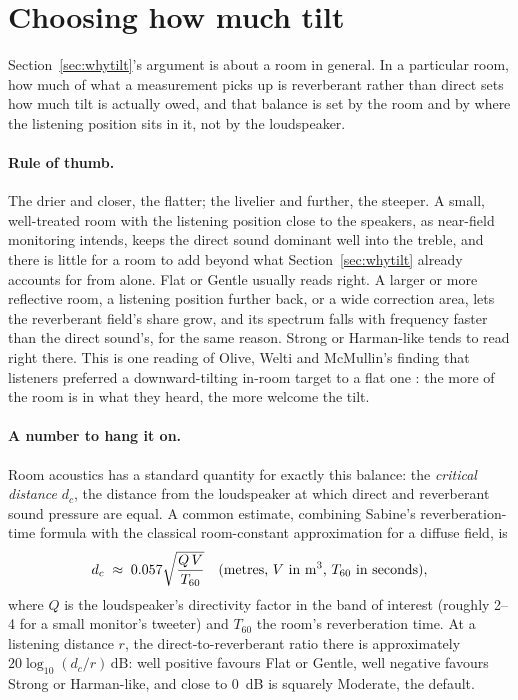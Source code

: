 \section{Choosing how much tilt}\label{sec:tiltchoice}
Section~\ref{sec:whytilt}'s argument is about a room in general. In a particular room, how much of what a measurement picks up is reverberant rather than direct sets how much tilt is actually owed, and that balance is set by the room and by where the listening position sits in it, not by the loudspeaker.

\paragraph{Rule of thumb.} The drier and closer, the flatter; the livelier and further, the steeper. A small, well-treated room with the listening position close to the speakers, as near-field monitoring intends, keeps the direct sound dominant well into the treble, and there is little for a room to add beyond what Section~\ref{sec:whytilt} already accounts for from  alone. Flat or Gentle usually reads right. A larger or more reflective room, a listening position further back, or a wide correction area, lets the reverberant field's share grow, and its spectrum falls with frequency faster than the direct sound's, for the same reason. Strong or Harman-like tends to read right there. This is one reading of Olive, Welti and McMullin's finding that listeners preferred a downward-tilting in-room target to a flat one \cite{Olive2013}: the more of the room is in what they heard, the more welcome the tilt.

\paragraph{A number to hang it on.} Room acoustics has a standard quantity for exactly this balance: the \emph{critical distance} $d_c$, the distance from the loudspeaker at which direct and reverberant sound pressure are equal. A common estimate, combining Sabine's reverberation-time formula with the classical room-constant approximation for a diffuse field, is
\begin{equation}
  d_c \;\approx\; 0.057\sqrt{\dfrac{Q\,V}{T_{60}}} \quad \text{(metres, $V$ in \si{\cubic\metre}, $T_{60}$ in seconds)},
  \label{eq:criticaldistance}
\end{equation}
where $Q$ is the loudspeaker's directivity factor in the band of interest (roughly 2--4 for a small monitor's tweeter) and $T_{60}$ the room's reverberation time. At a listening distance $r$, the direct-to-reverberant ratio there is approximately $20\log_{10}(d_c/r)\,\si{\dB}$: well positive favours Flat or Gentle, well negative favours Strong or Harman-like, and close to \SI{0}{\dB} is squarely Moderate, the default.

